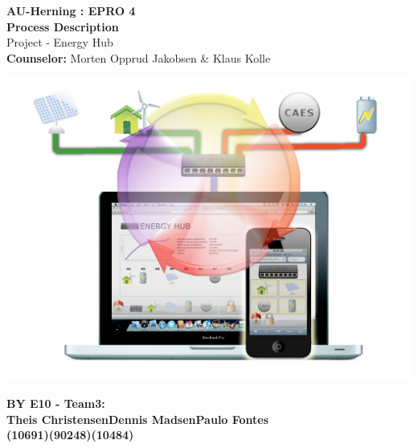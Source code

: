 \begin{centering}
\thispagestyle{empty} %
\begin{center}
\textbf{\Huge {AU-Herning : EPRO 4\\[0.1cm]Process Description}}\\
\huge {Project - Energy Hub}\\ \vspace{0.4cm}
\large{\textbf{Counselor:} Morten Opprud Jakobsen \& Klaus Kolle}\\ \vspace{0.0cm}
\end{center}

\centering
\includegraphics[width=1\textwidth]{images/frontpage1.png}
 \end{centering}
 
 
\begin{center}
\vspace{0.4cm}
\Large{\textbf{BY E10 - Team3: \\ \vspace{0.2cm}Theis Christensen\hspace{1.5cm}Dennis Madsen\hspace{1.5cm}Paulo Fontes}
\\\textbf{(10691)\hspace{3.7cm}(90248)\hspace{3.7cm}(10484)}}
\end{center}

\newpage
\thispagestyle{empty}
\mbox{}